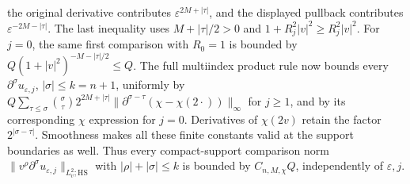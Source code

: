 \documentclass[
  11pt,
]{article}
\begin{document}
the original derivative contributes \(\varepsilon^{2M+|\tau|}\), and the
displayed pullback contributes \(\varepsilon^{-2M-|\tau|}\). The last
inequality uses \(M+|\tau|/2>0\) and \(1+R_j^2|v|^2\geq R_j^2|v|^2\).
For \(j=0\), the same first comparison with \(R_0=1\) is bounded by
\(Q(1+|v|^2)^{-M-|\tau|/2}\leq Q\). The full multiindex product rule now
bounds every \(\partial^\sigma u_{\varepsilon,j}\),
\(|\sigma|\leq k=n+1\), uniformly by
\(Q\sum_{\tau\leq\sigma}\binom\sigma\tau 2^{2M+|\tau|}\|\partial^{\sigma-\tau}(\chi-\chi(2\cdot))\|_\infty\)
for \(j\geq1\), and by its corresponding \(\chi\) expression for
\(j=0\). Derivatives of \(\chi(2v)\) retain the factor
\(2^{|\sigma-\tau|}\). Smoothness makes all these finite constants valid
at the support boundaries as well. Thus every compact-support comparison
norm \(\|v^\rho\partial^\sigma u_{\varepsilon,j}\|_{L^2_v;\mathrm{HS}}\)
with \(|\rho|+|\sigma|\leq k\) is bounded by \(C_{n,M,\chi}Q\),
independently of \(\varepsilon,j\).
\end{document}
